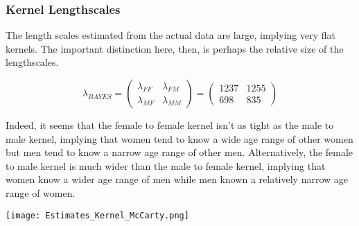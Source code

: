 \documentclass[12pt]{article}
\begin{document}
\pagebreak
\subsubsection*{Kernel Lengthscales}
\noindent The length scales estimated from the actual data are large, implying very flat kernels. The important distinction here, then, is perhaps the relative size of the lengthscales.

$$ \lambda_{BAYES}
= \left( \begin{array}{cc} \lambda_{FF} & \lambda_{FM} \\
\lambda_{MF} & \lambda_{MM} \end{array} \right) 
= \left( \begin{array}{cc}
1237 & 1255 \\
698 & 835 \end{array} \right) $$ \vspace{7 pt}

\noindent Indeed, it seems that the female to female kernel isn't as tight as the male to male kernel, implying that women tend to know a wide age range of other women but men tend to know a narrow age range of other men. Alternatively, the female to male kernel is much wider than the male to female kernel, implying that women know a wider age range of men while men known a relatively narrow age range of women.

\begin{center}
\texttt{[image: Estimates\_Kernel\_McCarty.png]}
\end{center}
\end{document}
